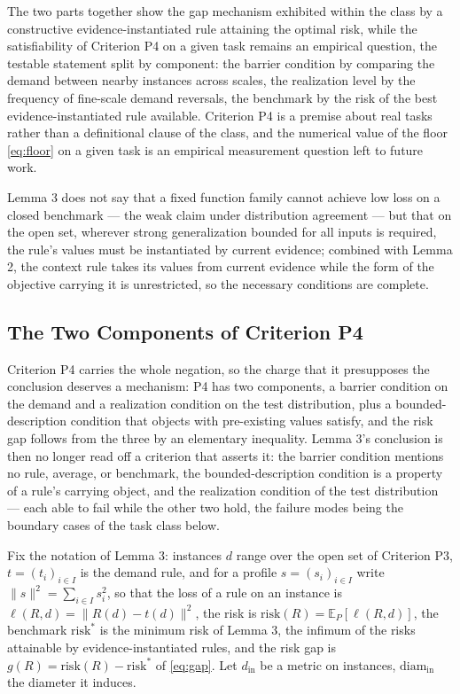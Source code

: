 The two parts together show the gap mechanism exhibited within the class by a constructive evidence-instantiated rule attaining the optimal risk, while the satisfiability of Criterion P4 on a given task remains an empirical question, the testable statement split by component: the barrier condition by comparing the demand between nearby instances across scales, the realization level by the frequency of fine-scale demand reversals, the benchmark by the risk of the best evidence-instantiated rule available. Criterion P4 is a premise about real tasks rather than a definitional clause of the class, and the numerical value of the floor \eqref{eq:floor} on a given task is an empirical measurement question left to future work.\qedbox

Lemma 3 does not say that a fixed function family cannot achieve low loss on a closed benchmark --- the weak claim under distribution agreement --- but that on the open set, wherever strong generalization bounded for all inputs is required, the rule's values must be instantiated by current evidence; combined with Lemma 2, the context rule takes its values from current evidence while the form of the objective carrying it is unrestricted, so the necessary conditions are complete.

\subsection{The Two Components of Criterion P4}
\label{sec:p4}

Criterion P4 carries the whole negation, so the charge that it presupposes the conclusion deserves a mechanism: P4 has two components, a barrier condition on the demand and a realization condition on the test distribution, plus a bounded-description condition that objects with pre-existing values satisfy, and the risk gap follows from the three by an elementary inequality. Lemma 3's conclusion is then no longer read off a criterion that asserts it: the barrier condition mentions no rule, average, or benchmark, the bounded-description condition is a property of a rule's carrying object, and the realization condition of the test distribution --- each able to fail while the other two hold, the failure modes being the boundary cases of the task class below.

Fix the notation of Lemma 3: instances $d$ range over the open set of Criterion P3, $t = (t_i )_{i \in I}$ is the demand rule, and for a profile $s = (s_i )_{i \in I}$ write $\| s \|^2 = \sum_{i \in I} s_i^2$, so that the loss of a rule on an instance is $\ell (R, d) = \| R(d) - t(d) \|^2$, the risk is $\mathrm{risk}(R) = \mathbb{E}_P [\ell (R, d)]$, the benchmark $\mathrm{risk}^*$ is the minimum risk of Lemma 3, the infimum of the risks attainable by evidence-instantiated rules, and the risk gap is $g(R) = \mathrm{risk}(R) - \mathrm{risk}^*$ of \eqref{eq:gap}. Let $d_{\mathrm{in}}$ be a metric on instances, $\mathrm{diam}_{\mathrm{in}}$ the diameter it induces.

